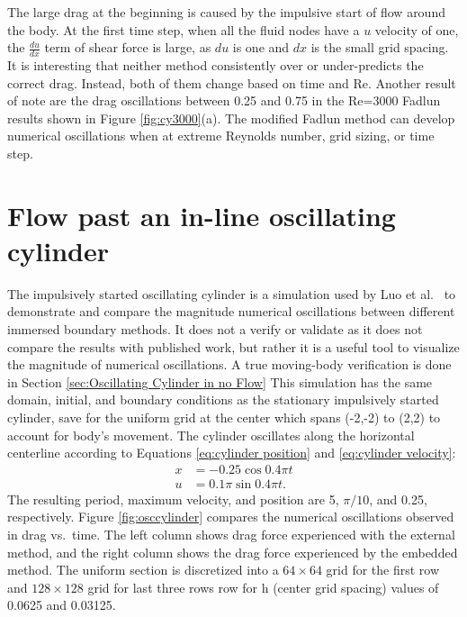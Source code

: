 The large drag at the beginning is caused by the impulsive start of flow around the body. 
At the first time step, when all the fluid nodes have a $u$ velocity of one, the $\frac{du}{dx}$ term of shear force is large, as $du$ is one and $dx$ is the small grid spacing. 
It is interesting that neither method consistently over or under-predicts the correct drag. 
Instead, both of them change based on time and Re. 
Another result of note are the drag oscillations between 0.25 and 0.75 in the Re=3000 Fadlun results shown in Figure \ref{fig:cy3000}(a). 
The modified Fadlun method can develop numerical oscillations when at extreme Reynolds number, grid sizing, or time step. 
\section{Flow past an in-line oscillating cylinder}
\label{sec:osccylinder}
The impulsively started oscillating cylinder is a simulation used by Luo et al.~\cite{Luo:2012gx} to demonstrate and compare the magnitude numerical oscillations between different immersed boundary methods. 
It does not a verify or validate as it does not compare the results with published work, but rather it is a useful tool to visualize the magnitude of numerical oscillations.
A true moving-body verification is done in Section \ref{sec:Oscillating Cylinder in no Flow}
This simulation has the same domain, initial, and boundary conditions as the stationary impulsively started cylinder, save for the uniform grid at the center which spans (-2,-2) to (2,2) to account for body's movement.
The cylinder oscillates along the horizontal centerline according to Equations \eqref{eq:cylinder position} and \eqref{eq:cylinder velocity}:
\begin{align}
x&=-0.25\cos{0.4\pi t}\label{eq:cylinder position}\\
u&=0.1\pi\sin{0.4\pi t}.\;\label{eq:cylinder velocity}
\end{align}
The resulting period, maximum velocity, and position are 5, $\pi/10$, and 0.25, respectively. 
Figure \ref{fig:osccylinder} compares the numerical oscillations observed in drag vs.~time. 
The left column shows drag force experienced with the external method, and the right column shows the drag force experienced by the embedded method.
The uniform section is discretized into a $64 \times 64$ grid for the first row and $ 128 \times 128$ grid for last three rows row for h (center grid spacing) values of 0.0625 and 0.03125. 
